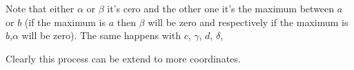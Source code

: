 Note that either $\alpha$ or $\beta$ it's cero and the other one it's the maximum between $a$ or $b$ (if the maximum is $a$ then $\beta$ will be zero and respectively if the maximum is $b$,$\alpha$ will be zero). The same happens with $c$, $\gamma$, $d$, $\delta$, 

Clearly this process can be extend to more coordinates.






